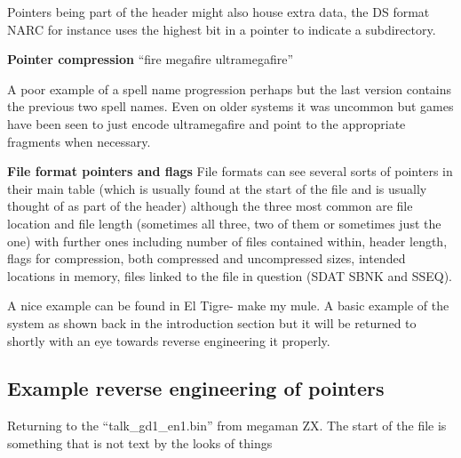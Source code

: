 \documentclass[
]{book}
\begin{document}
Pointers being part of the header might also house extra data, the DS format NARC for instance uses the highest bit in a pointer to indicate a subdirectory.

\textbf{Pointer compression} ``fire megafire ultramegafire''

A poor example of a spell name progression perhaps but the last version contains the previous two spell names. Even on older systems it was uncommon but games have been seen to just encode ultramegafire and point to the appropriate fragments when necessary.

\textbf{File format pointers and flags} File formats can see several sorts of pointers in their main table (which is usually found at the start of the file and is usually thought of as part of the header) although the three most common are file location and file length (sometimes all three, two of them or sometimes just the one) with further ones including number of files contained within, header length, flags for compression, both compressed and uncompressed sizes, intended locations in memory, files linked to the file in question (SDAT SBNK and SSEQ).

A nice example can be found in El Tigre- make my mule. A basic example of the system as shown back in the introduction section but it will be returned to shortly with an eye towards reverse engineering it properly.

\hypertarget{example-reverse-engineering-of-pointers}{%
\subsection{Example reverse engineering of pointers}\label{example-reverse-engineering-of-pointers}}

Returning to the ``talk\_gd1\_en1.bin'' from megaman ZX. The start of the file is something that is not text by the looks of things
\end{document}
